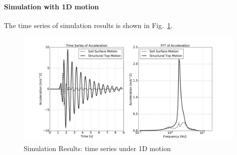 \paragraph{Simulation with 1D motion }
The time series of simulation results is shown in Fig.~\ref{fig_decon_3D_motion_1D_model_results_top_bottom_time_series_ssi3d_1D_motion}.
\begin{figure}[H]
  \centering
  \includegraphics[width = 15cm]{./Figure-files/nonlinear_analysis_steps/soil-structure-1D-ans/shell_structure_motion_node_38_x_acce_compare.pdf}
  \caption{Simulation Results: time series under 1D motion}
  \label{fig_decon_3D_motion_1D_model_results_top_bottom_time_series_ssi3d_1D_motion}
\end{figure}

